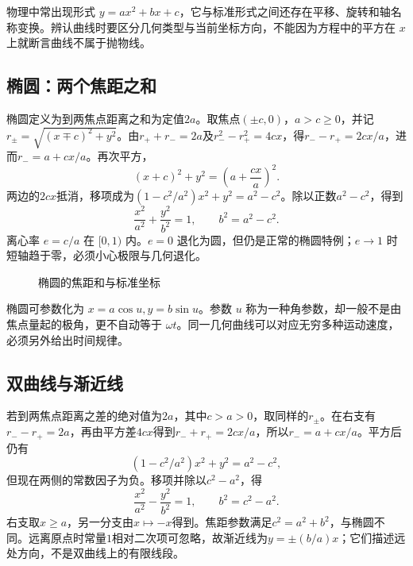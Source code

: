 \documentclass[11pt,openany,fontset=fandol]{ctexbook}
\theoremstyle{plain}\newtheorem{theorem}{定理}[chapter]\newtheorem{proposition}[theorem]{命题}
\theoremstyle{definition}\newtheorem{definition}{定义}[chapter]\newtheorem{example}{例}[chapter]
\theoremstyle{remark}\newtheorem*{remark}{说明}
\begin{document}
物理中常出现形式 $y=ax^2+bx+c$，它与标准形式之间还存在平移、旋转和轴名称变换。辨认曲线时要区分几何类型与当前坐标方向，不能因为方程中的平方在 $x$ 上就断言曲线不属于抛物线。

\subsection{椭圆：两个焦距之和}
椭圆定义为到两焦点距离之和为定值$2a$。取焦点$(\pm c,0)$，$a>c\ge0$，并记$r_\pm=\sqrt{(x\mp c)^2+y^2}$。由$r_++r_-=2a$及$r_-^2-r_+^2=4cx$，得$r_--r_+=2cx/a$，进而$r_-=a+cx/a$。再次平方，
\[(x+c)^2+y^2=\left(a+\frac{cx}{a}\right)^2.\]
两边的$2cx$抵消，移项成为$(1-c^2/a^2)x^2+y^2=a^2-c^2$。除以正数$a^2-c^2$，得到
\begin{equation}
\frac{x^2}{a^2}+\frac{y^2}{b^2}=1,\qquad b^2=a^2-c^2.
\end{equation}
离心率 $e=c/a$ 在 $[0,1)$ 内。$e=0$ 退化为圆，但仍是正常的椭圆特例；$e\to1$ 时短轴趋于零，必须小心极限与几何退化。
\begin{figure}[htbp]
\centering
{}
\caption{椭圆的焦距和与标准坐标}\label{fig:ellipse}
\end{figure}

椭圆可参数化为 $x=a\cos u,y=b\sin u$。参数 $u$ 称为一种角参数，却一般不是由焦点量起的极角，更不自动等于 $\omega t$。同一几何曲线可以对应无穷多种运动速度，必须另外给出时间规律。

\subsection{双曲线与渐近线}
若到两焦点距离之差的绝对值为$2a$，其中$c>a>0$，取同样的$r_\pm$。在右支有$r_--r_+=2a$，再由平方差$4cx$得到$r_-+r_+=2cx/a$，所以$r_-=a+cx/a$。平方后仍有
\[(1-c^2/a^2)x^2+y^2=a^2-c^2,\]
但现在两侧的常数因子为负。移项并除以$c^2-a^2$，得
\begin{equation}
\frac{x^2}{a^2}-\frac{y^2}{b^2}=1,\qquad b^2=c^2-a^2.
\end{equation}
右支取$x\ge a$，另一分支由$x\mapsto-x$得到。焦距参数满足$c^2=a^2+b^2$，与椭圆不同。远离原点时常量$1$相对二次项可忽略，故渐近线为$y=\pm(b/a)x$；它们描述远处方向，不是双曲线上的有限线段。
\end{document}

